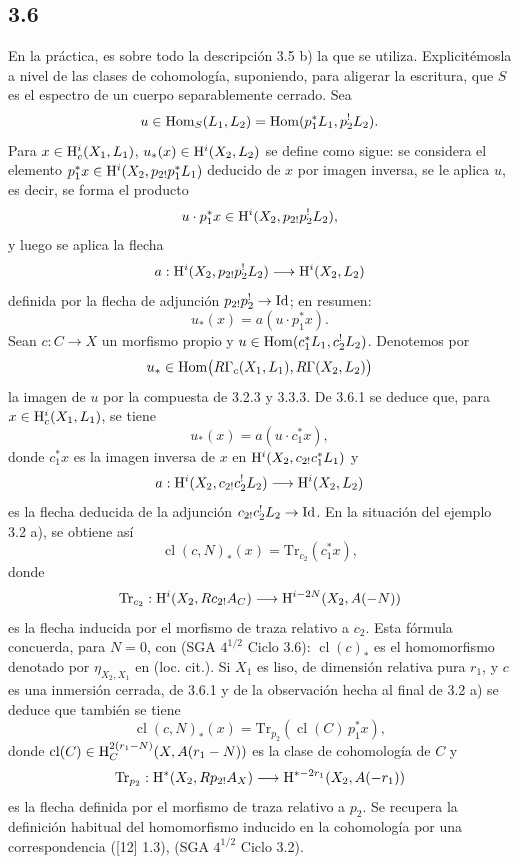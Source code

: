 \subsection*{3.6}
En la práctica, es sobre todo la descripción 3.5 b) la que se utiliza. Explicitémosla a nivel de las clases de cohomología, suponiendo, para aligerar la escritura, que $S$ es el espectro de un cuerpo separablemente cerrado. Sea
\[
u\in\operatorname{Hom}_S(L_1,L_2)=\operatorname{Hom}(p_1^*L_1,p_2^!L_2).
\]
Para $x\in\mathrm{H}_c^i(X_1,L_1)$, $u_*(x)\in\mathrm{H}^i(X_2,L_2)$ se define como sigue: se considera el elemento $p_1^*x\in\mathrm{H}^i(X_2,p_{2!}p_1^*L_1)$ deducido de $x$ por imagen inversa, se le aplica $u$, es decir, se forma el producto
\[
u\cdot p_1^*x\in \mathrm{H}^i(X_2,p_{2!}p_2^!L_2),
\]
y luego se aplica la flecha
\[
a:\mathrm{H}^i(X_2,p_{2!}p_2^!L_2)\longrightarrow \mathrm{H}^i(X_2,L_2)
\]
definida por la flecha de adjunción $p_{2!}p_2^!\to\mathrm{Id}$; en resumen:
\begin{equation}
u_*(x)=a(u\cdot p_1^*x).
\tag{3.6.1}
\end{equation}
Sean $c:C\to X$ un morfismo propio y $u\in\operatorname{Hom}(c_1^*L_1,c_2^!L_2)$. Denotemos por
\[
u_*\in\operatorname{Hom}\bigl(R\Gamma_c(X_1,L_1),R\Gamma(X_2,L_2)\bigr)
\]
la imagen de $u$ por la compuesta de 3.2.3 y 3.3.3. De 3.6.1 se deduce que, para $x\in\mathrm{H}_c^i(X_1,L_1)$, se tiene
\begin{equation}
u_*(x)=a(u\cdot c_1^*x),
\tag{3.6.2}
\end{equation}
donde $c_1^*x$ es la imagen inversa de $x$ en $\mathrm{H}^i(X_2,c_{2!}c_1^*L_1)$ y
\[
a:\mathrm{H}^i(X_2,c_{2!}c_2^!L_2)\longrightarrow \mathrm{H}^i(X_2,L_2)
\]
es la flecha deducida de la adjunción $c_{2!}c_2^!L_2\to\mathrm{Id}$. En la situación del ejemplo 3.2 a), se obtiene así
\begin{equation}
\operatorname{cl}(c,N)_*(x)=\mathrm{Tr}_{c_2}(c_1^*x),
\tag{3.6.3}
\end{equation}
donde
\[
\mathrm{Tr}_{c_2}:\mathrm{H}^i(X_2,Rc_{2!}A_C)\longrightarrow\mathrm{H}^{i-2N}(X_2,A(-N))
\]
es la flecha inducida por el morfismo de traza relativo a $c_2$. Esta fórmula concuerda, para $N=0$, con (SGA $4^{1/2}$ Ciclo 3.6): $\operatorname{cl}(c)_*$ es el homomorfismo denotado por $\eta_{X_2,X_1}$ en (loc. cit.). Si $X_1$ es liso, de dimensión relativa pura $r_1$, y $c$ es una inmersión cerrada, de 3.6.1 y de la observación hecha al final de 3.2 a) se deduce que también se tiene
\begin{equation}
\operatorname{cl}(c,N)_*(x)=\mathrm{Tr}_{p_2}(\operatorname{cl}(C)\,p_1^*x),
\tag{3.6.4}
\end{equation}
donde $\operatorname{cl}(C)\in \mathrm{H}_C^{2(r_1-N)}(X,A(r_1-N))$ es la clase de cohomología de $C$ y
\[
\mathrm{Tr}_{p_2}:\mathrm{H}^*(X_2,Rp_{2!}A_X)\longrightarrow \mathrm{H}^{*-2r_1}(X_2,A(-r_1))
\]
es la flecha definida por el morfismo de traza relativo a $p_2$. Se recupera la definición habitual del homomorfismo inducido en la cohomología por una correspondencia ([12] 1.3), (SGA $4^{1/2}$ Ciclo 3.2).

